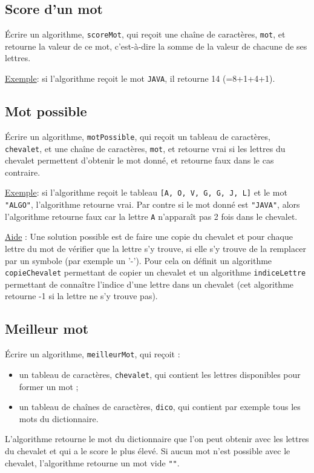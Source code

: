 		\subsection*{Score d'un mot}
			
			\'Ecrire un algorithme, \texttt{scoreMot}, 
			qui reçoit une chaîne de caractères, 
			\texttt{mot}, et retourne la valeur de ce mot, c'est-à-dire la somme de la valeur de chacune de ses lettres.
	
			\underline{Exemple}: si l'algorithme reçoit le mot \texttt{JAVA}, il retourne 14 (=8+1+4+1).
	
		\subsection*{Mot possible}
	
			\'Ecrire un algorithme, \texttt{motPossible}, qui reçoit un tableau de caractères, 
			\texttt{chevalet}, et une chaîne de caractères, 
			\texttt{mot}, et retourne vrai si les lettres du chevalet permettent d'obtenir le mot donné, et retourne faux dans le cas contraire. 
	
	
			\underline{Exemple}: si l'algorithme reçoit le tableau \texttt{[A, O, V, G, G, J, L]} 
			et le mot \texttt{"ALGO"}, l'algorithme retourne vrai. 
			Par contre si le mot donné est \texttt{"JAVA"}, 
			alors l'algorithme retourne faux car la lettre \texttt{A} n'apparaît pas 2 fois dans le chevalet.
	
	
			\underline{Aide} : Une solution possible est de faire une copie du chevalet 
			et pour chaque lettre du mot de vérifier que la lettre s'y trouve, 
			si elle s'y trouve de la remplacer par un symbole (par exemple un '-').
			Pour cela on définit un algorithme \texttt{copieChevalet} 
			permettant de copier un chevalet et un algorithme \texttt{indiceLettre} 
			permettant de connaître l'indice d'une lettre dans un chevalet 
			(cet algorithme retourne -1 si la lettre ne s'y trouve pas). 
	
		\subsection*{Meilleur mot}
	
			\'Ecrire un algorithme, \texttt{meilleurMot}, qui reçoit :
			\begin{itemize}
			\item un tableau de caractères, \texttt{chevalet}, qui contient les lettres disponibles pour former un mot ;
			\item un tableau de chaînes de caractères, \texttt{dico}, qui contient par exemple tous les mots du dictionnaire.
			\end{itemize}
			L'algorithme retourne le mot du dictionnaire que l'on peut obtenir avec les lettres du chevalet 
			et qui a le score le plus élevé. 
			Si aucun mot n'est possible avec le chevalet, l'algorithme retourne un mot vide \texttt{""}.
	
	
